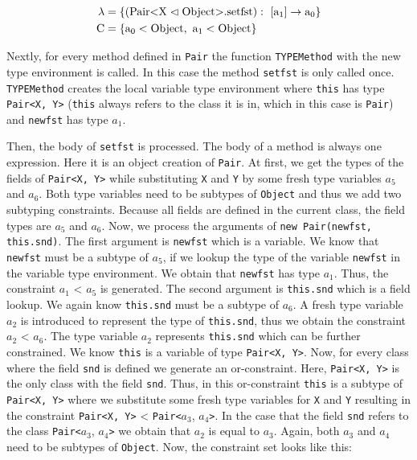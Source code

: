 \begin{align*}
    \lambda &= \{ ( \text{Pair} \text{<} \text{X} \vartriangleleft \text{Object} \text{>}. \text{setfst} ): \ [\text{a}_1] \to \text{a}_0 \}\\
    \text{C} &= \{ \text{a}_0 < \text{Object}, \ \text{a}_1 < \text{Object} \}\\
\end{align*}

Nextly, for every method defined in \verb|Pair| the function \verb|TYPEMethod| with the new type environment is called.
In this case the method \verb|setfst| is only called once. \verb|TYPEMethod| creates the local variable type environment where \verb|this| has type \verb|Pair<X, Y>| (\verb|this| always refers to the class it is in, which in this case is \verb|Pair|) and \verb|newfst| has type $a_1$.

Then, the body of \verb|setfst| is processed. The body of a method is always one expression. Here it is an object creation of \verb|Pair|.
At first, we get the types of the fields of \verb|Pair<X, Y>| while substituting \verb|X| and \verb|Y| by some fresh type variables $a_5$ and $a_6$. Both type variables need to be subtypes of \verb|Object| and thus we add two subtyping constraints. Because all fields are defined in the current class, the field types are $a_5$ and $a_6$. Now, we process the arguments of \verb|new Pair(newfst, this.snd)|.
The first argument is \verb|newfst| which is a variable. We know that \verb|newfst| must be a subtype of $a_5$, if we lookup the type of the variable \verb|newfst| in the variable type environment. We obtain that \verb|newfst| has type $a_1$. Thus, the constraint $a_1$ < $a_5$ is generated.
The second argument is \verb|this.snd| which is a field lookup. We again know \verb|this.snd| must be a subtype of $a_6$. A fresh type variable $a_2$ is introduced to represent the type of \verb|this.snd|, thus we obtain the constraint $a_2$ < $a_6$.
The type variable $a_2$ represents \verb|this.snd| which can be further constrained. We know \verb|this| is a variable of type \verb|Pair<X, Y>|.
Now, for every class where the field \verb|snd| is defined we generate an or-constraint. Here, \verb|Pair<X, Y>| is the only class with the field \verb|snd|. Thus, in this or-constraint \verb|this| is a subtype of \verb|Pair<X, Y>| where we substitute some fresh type variables for \verb|X| and \verb|Y| resulting in the constraint \verb|Pair<X, Y>| < \verb|Pair<|$a_3$, $a_4$\verb|>|.
In the case that the field \verb|snd| refers to the class \verb|Pair<|$a_3$, $a_4$\verb|>| we obtain that $a_2$ is equal to $a_3$. Again, both $a_3$ and $a_4$ need to be subtypes of \verb|Object|.
Now, the constraint set looks like this:

